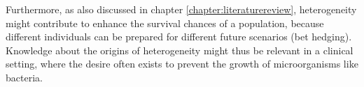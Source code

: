 Furthermore, as also discussed in chapter \ref{chapter:literaturereview},
heterogeneity might contribute to enhance the survival chances of a population, 
because different individuals can be prepared for different future scenarios (bet hedging).
%
Knowledge about the origins of heterogeneity might thus be relevant in a clinical setting,
where the desire often exists 
to prevent the growth of microorganisms like bacteria.









